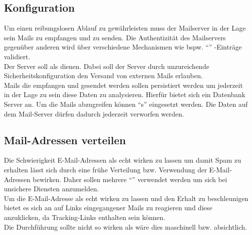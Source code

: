 \documentclass[a4paper,11pt,singlespacing]{article}
\begin{document}
	\subsection{Konfiguration}\label{sec:ProblemstellungKonfiguration}
		Um einen reibungslosen Ablauf zu gewährleisten muss der Mailserver in der Lage sein Mails zu empfangen und zu senden.
		Die Authentizität des Mailservers gegenüber anderen wird über verschiedene Mechanismen wie bspw. "`"' -Einträge validiert.
		\\
		Der Server soll als  dienen.
		Dabei soll der Server durch unzureichende Sicherheitskonfiguration den Versand von externen Mails erlauben.
		\\
		Mails die empfangen und gesendet werden sollen persistiert werden um jederzeit in der Lage zu sein diese Daten zu analysieren.
		Hierfür bietet sich ein Datenbank Server an. Um die Mails abzugreifen können "`s"' eingesetzt werden.
		Die Daten auf dem Mail-Server dürfen dadurch jederzeit verworfen werden.

	\subsection{Mail-Adressen verteilen}\label{sec:ProblemstellungMailsVerteilen}
		Die Schwierigkeit E-Mail-Adressen als echt wirken zu lassen um damit Spam zu erhalten lässt sich durch eine frühe Verteilung bzw. Verwendung der E-Mail-Adressen bewirken. %
		Daher sollen mehrere "`"' verwendet werden um sich bei unsichere Diensten anzumelden.
		\\
		Um die E-Mail-Adresse als echt wirken zu lassen und den Erhalt zu beschleunigen bietet es sich an auf Links eingegangener Mails zu reagieren und diese anzuklicken, da Tracking-Links enthalten sein können. %
		\\
		Die Durchführung sollte nicht so wirken als wäre dies maschinell bzw. absichtlich. %
	
\end{document}
